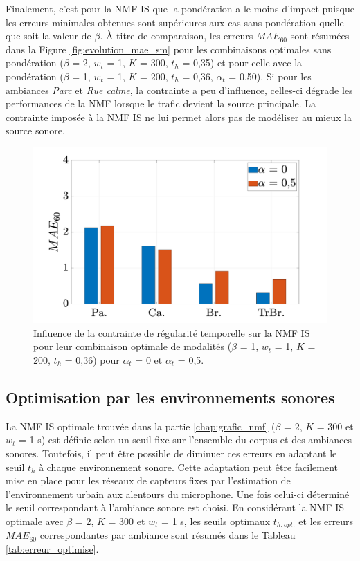Finalement, c'est pour la NMF IS que la pondération a le moins d'impact puisque les erreurs minimales obtenues sont supérieures aux cas sans pondération quelle que soit la valeur de $\beta$. \`A titre de comparaison, les erreurs $MAE_{60}$ sont résumées dans la Figure \ref{fig:evolution_mae_sm} pour les combinaisons optimales sans pondération ($\beta$ = 2, $w_t$ = 1, $K$ = 300, $t_h$ = 0,35) et pour celle avec la pondération ($\beta$ = 1, $w_t$ = 1, $K$ = 200, $t_h$ = 0,36, $\alpha_t$ = 0,50). Si pour les ambiances \textit{Parc} et \textit{Rue calme}, la contrainte a peu d'influence, celles-ci dégrade les performances de la NMF lorsque le trafic devient la source principale. La contrainte imposée à la NMF IS ne lui permet alors pas de modéliser au mieux la source sonore. 

\begin{figure}[h]
\centering
\includegraphics[width=.7\linewidth]{./figures/resultats/bar_TI_smooth.pdf}
\caption{Influence de la contrainte de régularité temporelle sur la NMF IS  pour leur combinaison optimale de modalités ($\beta$ = 1, $w_t$ = 1, $K$ = 200, $t_h$ = 0,36) pour $\alpha_t$ = 0 et $\alpha_t$ = 0,5.}
\label{fig:dist_grafic_sm}
\end{figure}


\subsection{Optimisation par les environnements sonores}\label{part:optimisationESU}


La NMF IS optimale trouvée dans la partie \ref{chap:grafic_nmf} ($\beta$ = 2, $K$ = 300 et $w_t$ = 1 s) est définie selon un seuil fixe sur l'ensemble du corpus et des ambiances sonores. Toutefois, il peut être possible de diminuer ces erreurs en adaptant le seuil $t_h$ à chaque environnement sonore. 
Cette adaptation peut être facilement mise en place pour les réseaux de capteurs fixes par l'estimation de l'environnement urbain aux alentours du microphone. Une fois celui-ci déterminé le seuil correspondant à l'ambiance sonore est choisi. 
En considérant la NMF IS optimale avec $\beta$ = 2, $K$ = 300 et $w_t$ = 1 s, les seuils optimaux $t_{h,opt.}$ et les erreurs $MAE_{60}$ correspondantes par ambiance sont résumés dans le Tableau \ref{tab:erreur_optimise}.

